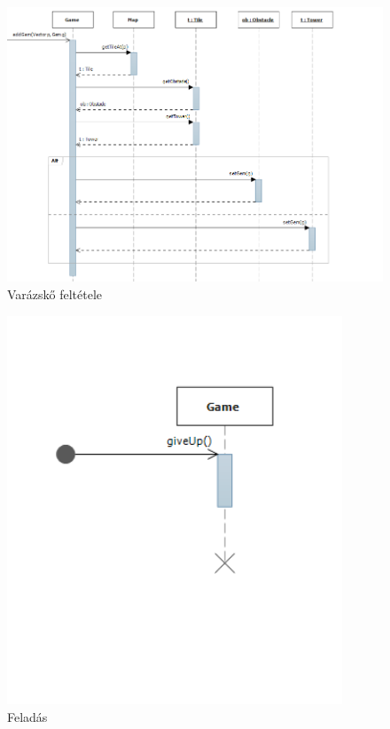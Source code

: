 \begin{figure}[H]
\begin{center}
\includegraphics[width=15cm]{images/adding_gem.png}
\caption{Varázskő feltétele}
\label{fig:adding_gem}
\end{center}
\end{figure}

\begin{figure}[H]
\begin{center}
\includegraphics[width=10cm]{images/giving_up.png}
\caption{Feladás}
\label{fig:giving_up}
\end{center}
\end{figure}


